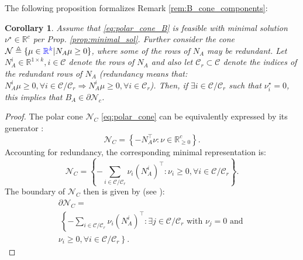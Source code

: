 \documentclass[letterpaper, 10 pt, conference]{ieeeconf}  %
\newtheorem{corollary}{\textbf{Corollary}}
\begin{document}
{
\color{red}
The following proposition formalizes Remark \ref{rem:B_cone_components}:
\begin{corollary}\label{cor:cone_boundary}
        Assume that \eqref{eq:polar_cone_B} is feasible with minimal solution $\nu^\star \in \mathbb{R}^c$ per Prop. \ref{prop:minimal_sol}. Further consider the cone $\mathcal{N} \triangleq \{ \mu \in {\color{blue}\mathbb{R}^k} | N_A \mu \geq 0\}$, where some of the rows of $N_A$ may be redundant. Let $N_A^i \in \mathbb{R}^{1\times k}, i\in \mathcal{C}$ denote the rows of $N_A$ and also let $\mathcal{C}_r \subset \mathcal{C}$ denote the indices of the redundant rows of $N_A$ (redundancy means that: $N_A^i \mu \geq 0, \forall i\in\mathcal{C}/\mathcal{C}_r \Longrightarrow N_A^i \mu \geq 0, \forall i\in\mathcal{C}_r$). Then, if $\exists i \in \mathcal{C}/\mathcal{C}_r$ such that $\nu^\star_i = 0 $, this implies that $B_A \in \partial \mathcal{N}_c$.   
\end{corollary}
\begin{proof}
    The polar cone $\mathcal{N}_C$ \eqref{eq:polar_cone} can be equivalently expressed by its generator \cite{linopt_book}:
    \begin{equation}
        \mathcal{N}_C
        = 
        \left\{
            -N_A^\top \nu 
            :
            \nu \in \mathbb{R}^c_{\geq 0}  
        \right\}.
    \end{equation}
Accounting for redundancy, the corresponding minimal representation is:
\begin{equation}
     \mathcal{N}_C
        = 
        \left\{
            -\sum_{i\in\mathcal{C}/\mathcal{C}_r}\nu_i(N_A^i)^\top  
            :
            \nu_i \geq 0, \forall i \in \mathcal{C}/\mathcal{C}_r  
        \right\}.
\end{equation}
The boundary of $\mathcal{N}_C$ then is given by (see \cite{rockafellar-1970a}):
\begin{equation}\label{eq:prop:bound:1}
    \begin{gathered}
        \partial\mathcal{N}_C
        = \\\
        \left\{
            -\sum_{i\in\mathcal{C}/\mathcal{C}_r}\nu_i(N_A^i)^\top  
            :
            \exists j\in \mathcal{C}/\mathcal{C}_r   \textrm{ with } \nu_j = 0
            \textrm{ and }
        \right. 
        \\
        \left.
            \nu_i \geq 0, \forall i \in \mathcal{C}/\mathcal{C}_r 
        \right\}.
    \end{gathered}
\end{equation}

\end{proof}}
\end{document}
